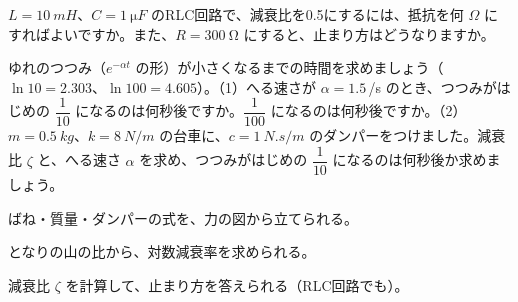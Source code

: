 \bkproblem $L=\qty{10}{mH}$、$C=\qty{1}{\micro F}$ のRLC回路で、減衰比を0.5にするには、抵抗を何 $\Omega$ にすればよいですか。また、$R=\qty{300}{\ohm}$ にすると、止まり方はどうなりますか。

\bkproblem ゆれのつつみ（$e^{-\alpha t}$ の形）が小さくなるまでの時間を求めましょう（$\ln10=2.303$、$\ln100=4.605$）。\newline（1）へる速さが $\alpha=1.5$\,/s のとき、つつみがはじめの $\dfrac{1}{10}$ になるのは何秒後ですか。$\dfrac{1}{100}$ になるのは何秒後ですか。\newline（2）$m=\qty{0.5}{kg}$、$k=\qty{8}{N/m}$ の台車に、$c=\qty{1}{N.s/m}$ のダンパーをつけました。減衰比 $\zeta$ と、へる速さ $\alpha$ を求め、つつみがはじめの $\dfrac{1}{10}$ になるのは何秒後か求めましょう。

\begin{furikaeri}
\begin{checklist}
\item ばね・質量・ダンパーの式を、力の図から立てられる。
\item となりの山の比から、対数減衰率を求められる。
\item 減衰比 $\zeta$ を計算して、止まり方を答えられる（RLC回路でも）。
\end{checklist}
\end{furikaeri}

